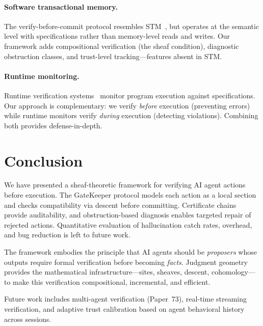 \documentclass[11pt]{article}
\begin{document}
\paragraph{Software transactional memory.}
The verify-before-commit protocol resembles STM~\cite{Shavit1997},
but operates at the semantic level with specifications rather than
memory-level reads and writes.  Our framework adds compositional
verification (the sheaf condition), diagnostic obstruction classes,
and trust-level tracking---features absent in STM.

\paragraph{Runtime monitoring.}
Runtime verification systems~\cite{Leucker2009} monitor program
execution against specifications.  Our approach is complementary:
we verify \emph{before} execution (preventing errors) while runtime
monitors verify \emph{during} execution (detecting violations).
Combining both provides defense-in-depth.


\section{Conclusion}\label{sec:conclusion}

We have presented a sheaf-theoretic framework for verifying AI agent
actions before execution.  The GateKeeper protocol
models each action as a local section and checks compatibility via
descent before committing.  Certificate chains provide auditability,
and obstruction-based diagnosis enables targeted repair of rejected
actions.  Quantitative evaluation of hallucination catch rates, overhead,
and bug reduction is left to future work.

The framework embodies the principle that AI agents should be
\emph{proposers} whose outputs require formal verification before
becoming \emph{facts}.  Judgment geometry provides the mathematical
infrastructure---sites, sheaves, descent, cohomology---to make this
verification compositional, incremental, and efficient.

Future work includes multi-agent verification (\cf Paper~73),
real-time streaming verification, and adaptive trust calibration
based on agent behavioral history across sessions.
\end{document}
